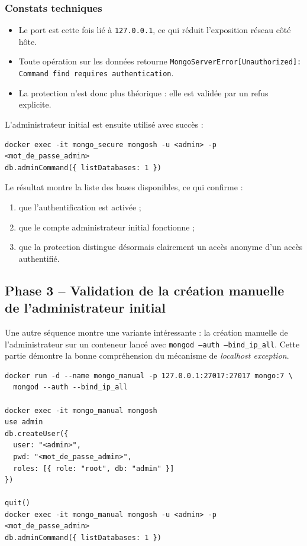 \documentclass[11pt,a4paper]{article}
\begin{document}
\subsubsection*{Constats techniques}
\begin{itemize}
  \item Le port est cette fois lié à \texttt{127.0.0.1}, ce qui réduit l'exposition réseau côté hôte.
  \item Toute opération sur les données retourne \texttt{MongoServerError[Unauthorized]: Command find requires authentication}.
  \item La protection n'est donc plus théorique : elle est validée par un refus explicite.
\end{itemize}

L'administrateur initial est ensuite utilisé avec succès :

\begin{tcolorbox}[breakable,colback=CodeBg,colframe=CodeFrame,title=Validation du compte administrateur]
\begin{Verbatim}[fontsize=\small,breaklines,breakanywhere]
docker exec -it mongo_secure mongosh -u <admin> -p <mot_de_passe_admin>
db.adminCommand({ listDatabases: 1 })
\end{Verbatim}
\end{tcolorbox}

Le résultat montre la liste des bases disponibles, ce qui confirme :
\begin{enumerate}
  \item que l'authentification est activée ;
  \item que le compte administrateur initial fonctionne ;
  \item que la protection distingue désormais clairement un accès anonyme d'un accès authentifié.
\end{enumerate}

\subsection{Phase 3 -- Validation de la création manuelle de l'administrateur initial}

Une autre séquence montre une variante intéressante : la création manuelle de l'administrateur sur un conteneur lancé avec \texttt{mongod --auth --bind\_ip\_all}. Cette partie démontre la bonne compréhension du mécanisme de \emph{localhost exception}.

\begin{tcolorbox}[breakable,colback=CodeBg,colframe=CodeFrame,title=Séquence manuelle observée]
\begin{Verbatim}[fontsize=\small,breaklines,breakanywhere]
docker run -d --name mongo_manual -p 127.0.0.1:27017:27017 mongo:7 \
  mongod --auth --bind_ip_all

docker exec -it mongo_manual mongosh
use admin
db.createUser({
  user: "<admin>",
  pwd: "<mot_de_passe_admin>",
  roles: [{ role: "root", db: "admin" }]
})

quit()
docker exec -it mongo_manual mongosh -u <admin> -p <mot_de_passe_admin>
db.adminCommand({ listDatabases: 1 })
\end{Verbatim}
\end{tcolorbox}
\end{document}
